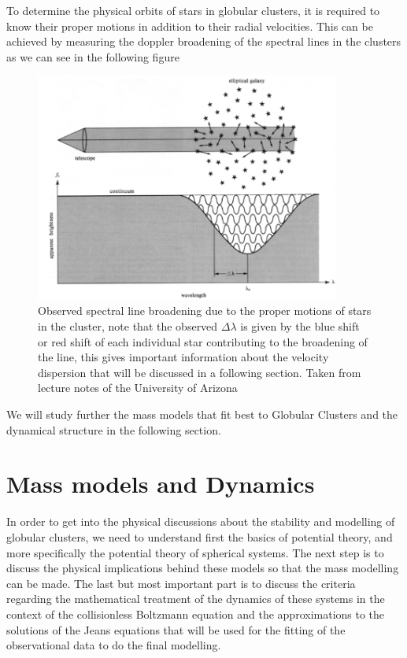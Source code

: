 To determine the physical orbits of stars in globular clusters, it is required to know their proper motions in addition to their radial velocities. This can be achieved by measuring the doppler broadening of the spectral lines in the clusters as we can see in the following figure

\begin{figure}[H]
\centering
\includegraphics[width=10cm]{images/4_gcs.png}
\caption[Spectral line broadening]{Observed spectral line broadening due to the proper motions of stars in the cluster, note that the observed $\Delta\lambda$ is given by the blue shift or red shift of each individual star contributing to the broadening of the line, this gives important information about the velocity dispersion that will be discussed in a following section. Taken from lecture notes of the University of Arizona}
\end{figure}

We will study further the mass models that fit best to Globular Clusters and the dynamical structure in the following section.

\section{Mass models and Dynamics}

In order to get into the physical discussions about the stability and modelling of globular clusters, we need to understand first the basics of potential theory, and more specifically the potential theory of spherical systems. The next step is to discuss the physical implications behind these models so that the mass modelling can be made. The last but most important part is to discuss the criteria regarding the mathematical treatment of the dynamics of these systems in the context of the collisionless Boltzmann equation and the approximations to the solutions of the Jeans equations that will be used for the fitting of the observational data to do the final modelling.

